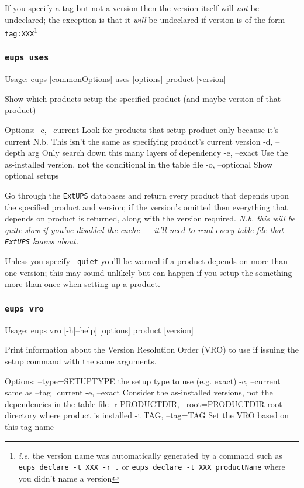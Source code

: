 \documentclass{article}
\newcommand{\code}[1]{\texttt{#1}}
\newcommand{\eups}{\code{ExtUPS}\xspace}
\let\overbatim=\verbatim
\let\oendverbatim=\endverbatim
\renewenvironment{verbatim}
{\center\minipage{16cm}\overbatim}
{\oendverbatim\endminipage\endcenter}
\begin{document}
If you specify a tag but not a version then the version itself will \textit{not} be undeclared; the exception
is that it \textit{will} be undeclared if version is of the form \code{tag:XXX}\footnote{
  \textit{i.e.} the version name was automatically
generated by a command such as  \code{eups declare -t XXX -r .} or \code{eups declare -t XXX productName} where you didn't name a version}


\subsubsection{\code{eups uses}}
\begin{verbatim}
Usage:
    eups [commonOptions] uses [options] product [version]

Show which products setup the specified product (and maybe version of that product)

Options:
   -c, --current           Look for products that setup product only because it's current
                           N.b. This isn't the same as specifying product's current version
   -d, --depth      arg    Only search down this many layers of dependency
   -e, --exact             Use the as-installed version, not the conditional in the table file
   -o, --optional          Show optional setups
\end{verbatim}

Go through the \eups databases and return every product that depends upon the specified product and version;
if the version's omitted then everything that depends on product is returned, along with the version
required. \textit{N.b.  this will be quite slow if you've disabled the cache --- it'll need to read every table
  file that \eups knows about.}

Unless you specify \code{--quiet} you'll be warned if a product depends on
more than one version;  this may sound unlikely but can happen if you setup
the something more than once when setting up a product.


\subsubsection{\code{eups vro}}
\begin{verbatim}Usage: eups vro [-h|--help] [options] product [version]

Print information about the Version Resolution Order (VRO) to use if issuing
the setup command with the same arguments.

Options:
  --type=SETUPTYPE      the setup type to use (e.g. exact)
  -c, --current         same as --tag=current
  -e, --exact           Consider the as-installed versions, not the
                        dependencies in the table file
  -r PRODUCTDIR, --root=PRODUCTDIR
                        root directory where product is installed
  -t TAG, --tag=TAG     Set the VRO based on this tag name
\end{verbatim}
\end{document}
